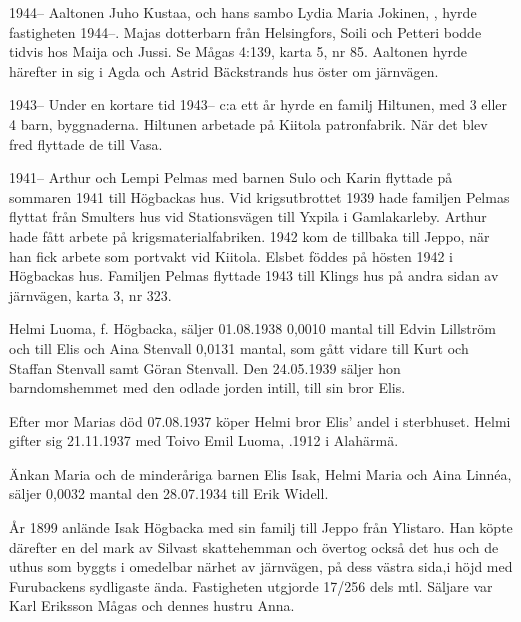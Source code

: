 
1944--
Aaltonen Juho Kustaa,  och hans sambo Lydia Maria Jokinen, , hyrde fastigheten 1944--. Majas dotterbarn från Helsingfors, Soili och Petteri bodde tidvis hos Maija och Jussi. Se Mågas 4:139, karta 5, nr 85. Aaltonen hyrde härefter in sig i Agda och Astrid Bäckstrands hus öster om järnvägen.

1943--
Under en kortare tid 1943-- c:a ett år hyrde en familj Hiltunen, med 3 eller 4 barn, byggnaderna. Hiltunen arbetade på Kiitola patronfabrik. När det blev fred flyttade de till Vasa.

1941--
Arthur och Lempi Pelmas med barnen Sulo och Karin	flyttade på sommaren 1941 till Högbackas hus. Vid krigsutbrottet 1939 hade familjen Pelmas flyttat från Smulters hus vid Stationsvägen till Yxpila i Gamlakarleby. Arthur hade fått arbete på krigsmaterialfabriken. 1942 kom de tillbaka till Jeppo, när han fick arbete som portvakt vid Kiitola. Elsbet föddes på hösten 1942 i Högbackas hus. Familjen Pelmas flyttade 1943 till Klings hus på andra sidan av järnvägen, karta 3, nr 323.


Helmi Luoma, f. Högbacka, säljer 01.08.1938 0,0010 mantal till Edvin Lillström och till Elis och Aina Stenvall 0,0131 mantal, som gått vidare till Kurt och Staffan Stenvall samt Göran Stenvall. Den 24.05.1939 säljer hon barndomshemmet med den odlade jorden intill, till sin bror Elis.


Efter mor Marias död 07.08.1937 köper Helmi bror Elis' andel i sterbhuset. Helmi gifter sig 21.11.1937 med Toivo Emil Luoma, .1912 i Alahärmä.\jhvspace{}


Änkan Maria och de minderåriga barnen Elis Isak, Helmi Maria och Aina Linnéa, säljer 0,0032 mantal den 28.07.1934 till Erik Widell.\jhvspace{}


År 1899 anlände Isak Högbacka med sin familj till Jeppo från Ylistaro. Han köpte därefter en del mark av Silvast skattehemman och övertog också det hus och de uthus som byggts i omedelbar närhet av järnvägen, på dess västra sida,i höjd med Furubackens sydligaste ända. Fastigheten utgjorde 17/256 dels mtl. Säljare var Karl Eriksson Mågas och dennes hustru Anna.


